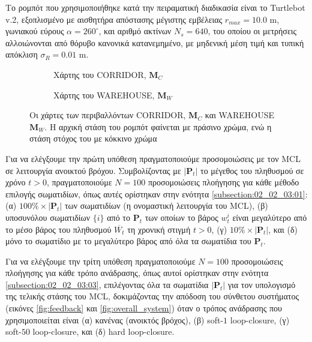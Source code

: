 Το ρομπότ που χρησιμοποιήθηκε κατά την πειραματική διαδικασία είναι το
Turtlebot v.2, εξοπλισμένο με αισθητήρα απόστασης μέγιστης εμβέλειας
$r_{max} = 10.0$ m, γωνιακού εύρους $\alpha = 260^{\circ}$, και αριθμό ακτίνων
$N_s = 640$, του οποίου οι μετρήσεις αλλοιώνονται από θόρυβο κανονικά
κατανεμημένο, με μηδενική μέση τιμή και τυπική απόκλιση $\sigma_R = 0.01$ m.

\begin{figure}\hspace{0.5cm}
  \begin{subfigure}{0.49\linewidth}\centering
    \vspace{1.0cm}
    
    \vspace{1.0cm}
    \caption{\small Χάρτης του CORRIDOR, $\bm{M}_C$}
    \label{fig:02_02_04:map_corridor}
  \end{subfigure}\hfill
  \begin{subfigure}{0.49\linewidth} \centering
    
    \vspace{0.25cm}
    \caption{\small Χάρτης του WAREHOUSE, $\bm{M}_W$}
    \label{fig:02_02_04:map_warehouse}
  \end{subfigure}
  \caption{\small Οι χάρτες των περιβαλλόντων CORRIDOR, $\bm{M}_C$ και
           WAREHOUSE $\bm{M}_W$. Η αρχική στάση του ρομπότ φαίνεται με πράσινο
           χρώμα, ενώ η στάση στόχος του με κόκκινο χρώμα}
\label{fig:02_02_04:maps}
\end{figure}

Για να ελέγξουμε την πρώτη υπόθεση πραγματοποιούμε προσομοιώσεις με τον MCL σε
λειτουργία ανοικτού βρόχου. Συμβολίζοντας με $|\bm{P}_t|$ το μέγεθος του
πληθυσμού σε χρόνο $t>0$, πραγματοποιούμε $N=100$ προσομοιώσεις πλοήγησης για
κάθε μέθοδο επιλογής σωματιδίων, όπως αυτές ορίστηκαν στην ενότητα
\ref{subsection:02_02_03:01}: (α) $100\% \times |\bm{P}_t|$ των σωματιδίων (η
ονομαστική λειτουργία του MCL), (β) υποσυνόλου σωματιδίων $\{i\}$ από το
$\bm{P}_t$ των οποίων το βάρος $w_t^i$ είναι μεγαλύτερο από το μέσο βάρος του
πληθυσμού $\overline{W_t}$ τη χρονική στιγμή $t>0$, (γ) $10\% \times
|\bm{P}_t|$, και (δ) μόνο το σωματίδιο με το μεγαλύτερο βάρος από όλα τα
σωματίδια του $\bm{P}_t$.

Για να ελέγξουμε την τρίτη υπόθεση πραγματοποιούμε $N=100$ προσομοιώσεις
πλοήγησης για κάθε τρόπο ανάδρασης, όπως αυτοί ορίστηκαν στην ενότητα
\ref{subsection:02_02_03:03}, επιλέγοντας όλα τα σωματίδια $|\bm{P}_t|$ για τον
υπολογισμό της τελικής στάσης του MCL, δοκιμάζοντας την απόδοση του σύνθετου
συστήματος (εικόνες \ref{fig:feedback} και \ref{fig:overall_system}) όταν ο
τρόπος ανάδρασης που χρησιμοποιείται είναι (α) κανένας (ανοικτός βρόχος), (β)
soft-$1$ loop-closure, (γ) soft-$50$ loop-closure, και (δ) hard loop-closure.

